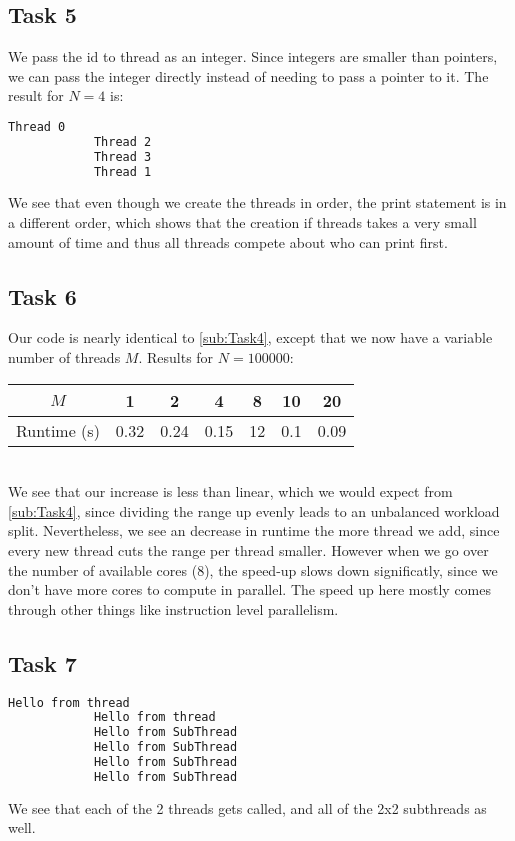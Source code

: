 \documentclass[a4paper]{scrartcl}
\begin{document}
    \subsection{Task 5}
        We pass the id to thread as an integer. Since integers are smaller than
        pointers, we can pass the integer directly instead of needing to pass a
        pointer to it. The result for $N=4$ is:\\
        \begin{lstlisting}[language=bash]
            Thread 0
            Thread 2
            Thread 3
            Thread 1
        \end{lstlisting}
        We see that even though we create the threads in order, the print
        statement is in a different order, which shows that the creation if
        threads takes a very small amount of time and thus all threads compete
        about who can print first.

    \subsection{Task 6}
        Our code is nearly identical to \ref{sub:Task4}, except that we now have
    a variable number of threads $M$. Results for $N=100000$:\\[10pt]
    \noindent\begin{tabular}{c|c|c|c|c|c|c}
        $M$ & 1 & 2 & 4 & 8 & 10 & 20 \\
        \hline
        Runtime (s) & 0.32 & 0.24 & 0.15 & 12 & 0.1 & 0.09
    \end{tabular}\\[10pt]
    We see that our increase is less than linear, which we would expect from
    \ref{sub:Task4}, since dividing the range up evenly leads to an unbalanced
    workload split. Nevertheless, we see an decrease in runtime the more thread
    we add, since every new thread cuts the range per thread smaller. However
    when we go over the number of available cores (8), the speed-up slows down
    significatly, since we don't have more cores to compute in parallel. The
    speed up here mostly comes through other things like instruction level
    parallelism.

    \subsection{Task 7}
        \begin{lstlisting}[language=bash]
            Hello from thread
            Hello from thread
            Hello from SubThread
            Hello from SubThread
            Hello from SubThread
            Hello from SubThread
        \end{lstlisting}
        We see that each of the 2 threads gets called, and all of the 2x2 subthreads
        as well.
    
\end{document}
